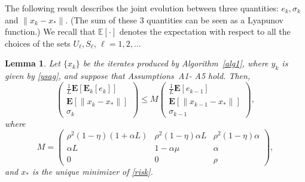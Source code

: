 \documentclass[11pt]{article}
\newtheorem{lem}[thm]{Lemma}
\newcommand{\E}{\mathbf{E}}
\begin{document}
The following result  describes the joint evolution  between  three quantities:  $e_k, \sigma_k$ and  $ \| x_k - x_*\|$. (The sum of these 3 quantities can be seen as a Lyapunov function.) We recall that  $\mathbb{E} [\cdot]$ denotes the expectation with respect to all the choices of  the sets $U_\ell, S_\ell$, $\ell = 1, 2, \ldots $ 


\begin{lem} \label{lemma:main} Let $\{x_k\}$ be the iterates produced by Algorithm~\ref{alg1}, where $y_k$ is given by \eqref{ysag}, and suppose that Assumptions~A1- A5 hold.  Then, 
\begin{equation}\label{eq:control}
 \begin{pmatrix} \frac{1}{L}\E[\E_k[e_k]]\\ \E[\|x_k-x_\ast \|] \\ \sigma_k \end{pmatrix} 
\leq M
 \begin{pmatrix} \frac{1}{L}\E[e_{k-1}] \\ \E[\| x_{k-1}-x_\ast \|] \\ \sigma_{k-1} \end{pmatrix} ,
\end{equation}
where
\begin{equation}\label{eq:M}
 M = \begin{pmatrix} \rho^2(1-\eta)(1+\alpha  L)  &    \rho^2(1-\eta)\alpha L & \rho^2(1-\eta) \alpha \\  
                   \alpha L  & 1-\alpha \mu &  \alpha  \\
                   0 & 0 &  \rho \end{pmatrix},                   
\end{equation}
and $x_\ast$ is the unique minimizer of \eqref{risk}.
\end{lem}
\end{document}
